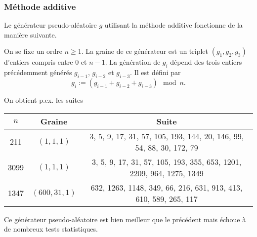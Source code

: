 \begin{frame}[fragile]\frametitle{Méthode additive}
Le générateur pseudo-aléatoire $g$ utilisant la \alert{méthode additive}
fonctionne de la manière suivante.
\medskip

On se fixe un ordre $n \geq 1$. La graine de ce générateur est
un triplet $(g_1, g_2, g_3)$ d'entiers compris entre $0$ et $n - 1$.
La génération de $g_i$ dépend des trois entiers précédemment
générés $g_{i - 1}$, $g_{i - 2}$ et $g_{i - 3}$. Il est défini par
\begin{equation*}
    g_i := (g_{i - 1} + g_{i - 2} + g_{i - 3}) \mod n.
\end{equation*}

On obtient p.ex. les suites
\begin{center} \scriptsize
    \begin{tabular}{c|c|c}
        $n$ & Graine & Suite \\ \hline
        211 & $(1, 1, 1)$ & 3, 5, 9, 17, 31, 57, 105, 193, 144, 20, 146,
            99, 54, 88, 30, 172, 79 \\
        3099 & $(1, 1, 1)$ & 3, 5, 9, 17, 31, 57, 105, 193, 355, 653, 1201,
            2209, 964, 1275, 1349 \\
        1347 & $(600, 31, 1)$ & 632, 1263, 1148, 349, 66, 216, 631, 913,
            413, 610, 589, 265, 117
    \end{tabular}
\end{center}
\medskip

Ce générateur pseudo-aléatoire est bien meilleur que le précédent mais
échoue à de nombreux tests statistiques.
\end{frame}

